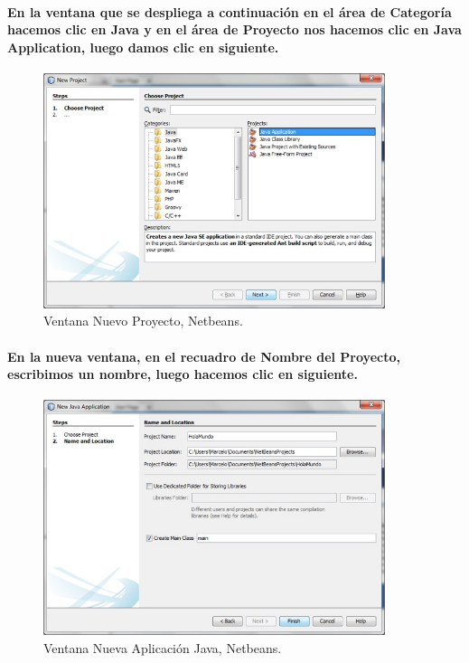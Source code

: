 \documentclass[12pt]{book} %
\begin{document}
\paragraph{En la ventana que se despliega a continuación en el área de Categoría hacemos clic en Java y en el área de Proyecto nos hacemos clic en Java Application, luego damos clic en siguiente.}

	\begin{figure}[h!]
		\centering
			\includegraphics[width=10cm]{Hola_mundo_002.jpg}
			\caption{Ventana Nuevo Proyecto, Netbeans.}
		
	\end{figure}

\paragraph{En la nueva ventana, en el recuadro de Nombre del Proyecto, escribimos un nombre, luego hacemos clic en siguiente.}

	\begin{figure}[h!]
		\centering
			\includegraphics[width=10cm]{Hola_mundo_003.jpg}
			\caption{Ventana Nueva Aplicaci\'on Java, Netbeans.}
		
	\end{figure}
\end{document}
